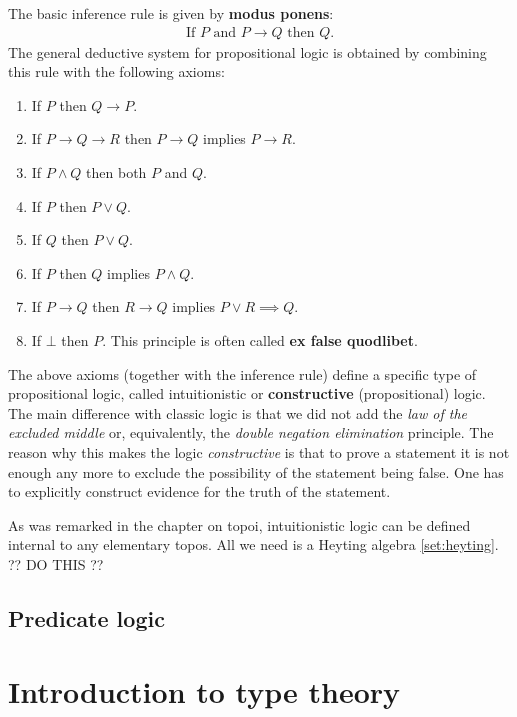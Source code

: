     The basic inference rule is given by \textbf{modus ponens}:
    \begin{gather}
        \text{If } P \text{ and } P\rightarrow Q \text{ then } Q.
    \end{gather}
    The general deductive system for propositional logic is obtained by combining this rule with the following axioms:
    \begin{enumerate}
        \item If $P$ then $Q\rightarrow P$.
        \item If $P\rightarrow Q \rightarrow R$ then $P\rightarrow Q$ implies $P\rightarrow R$.
        \item If $P\land Q$ then both $P$ and $Q$.
        \item If $P$ then $P\lor Q$.
        \item If $Q$ then $P\lor Q$.
        \item If $P$ then $Q$ implies $P\land Q$.
        \item If $P\rightarrow Q$ then $R\rightarrow Q$ implies $P\lor R\implies Q$.
        \item If $\bot$ then $P$. This principle is often called \textbf{ex false quodlibet}.
    \end{enumerate}

    \begin{remark}
        The above axioms (together with the inference rule) define a specific type of propositional logic, called intuitionistic or \textbf{constructive} (propositional) logic. The main difference with classic logic is that we did not add the \textit{law of the excluded middle} or, equivalently, the \textit{double negation elimination} principle. The reason why this makes the logic \textit{constructive} is that to prove a statement it is not enough any more to exclude the possibility of the statement being false. One has to explicitly construct evidence for the truth of the statement.

        As was remarked in the chapter on topoi, intuitionistic logic can be defined internal to any elementary topos. All we need is a Heyting algebra \ref{set:heyting}. ?? DO THIS ??
    \end{remark}

\subsection{Predicate logic}

\section{Introduction to type theory}

